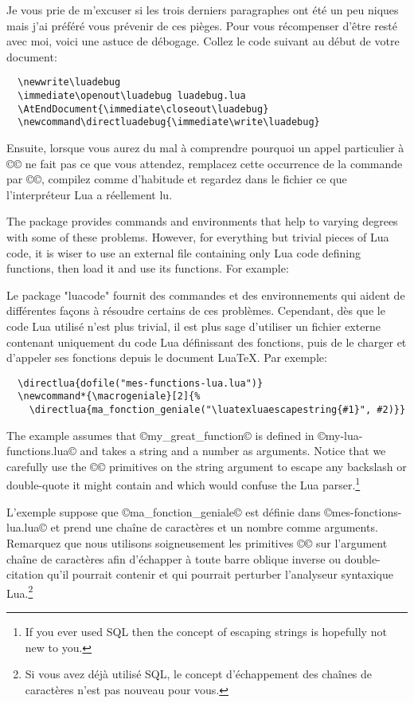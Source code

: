 \documentclass{lltxdoc}
\begin{document}
Je vous prie de m'excuser si les trois derniers paragraphes ont été un peu \tex{}niques
mais j'ai préféré vous prévenir de ces pièges. Pour vous récompenser d'être resté
avec moi, voici une astuce de débogage.
Collez le code suivant au début de votre document:
\begin{Verbatim}
  \newwrite\luadebug
  \immediate\openout\luadebug luadebug.lua
  \AtEndDocument{\immediate\closeout\luadebug}
  \newcommand\directluadebug{\immediate\write\luadebug}
\end{Verbatim}
Ensuite, lorsque vous aurez du mal à comprendre pourquoi un appel particulier
à ©\directlua© ne fait pas ce que vous attendez, remplacez cette occurrence
de la commande par ©\directluadebug©, compilez comme d'habitude et regardez
dans le fichier  ce que l'interpréteur Lua a réellement lu.


The  package provides commands and environments that help to
varying degrees with some of these problems. However, for everything but
trivial pieces of Lua code, it is wiser to use an external file containing
only Lua code defining functions, then load it and use its functions. For
example:

Le package "luacode" fournit des commandes et des environnements qui aident de différentes façons à résoudre certains de ces problèmes. Cependant, dès que le code Lua utilisé n'est plus trivial, il est plus sage d'utiliser un fichier externe contenant uniquement du code Lua définissant des fonctions, puis de le charger et d'appeler ses fonctions depuis le document LuaTeX. Par exemple:
\begin{Verbatim}
  \directlua{dofile("mes-functions-lua.lua")}
  \newcommand*{\macrogeniale}[2]{%
    \directlua{ma_fonction_geniale("\luatexluaescapestring{#1}", #2)}}
\end{Verbatim}
The example assumes that ©my_great_function© is defined in
©my-lua-functions.lua© and takes a string and a number as arguments. Notice
that we carefully use the ©\luatexluaescapestring© primitives on the string
argument to escape any backslash or double-quote it might contain and which
would confuse the Lua parser.\footnote{If you ever used SQL then the concept
  of escaping strings is hopefully not new to you.}

L'exemple suppose que ©ma_fonction_geniale© est définie dans ©mes-fonctions-lua.lua© et prend une chaîne de caractères et un nombre comme arguments. Remarquez que nous utilisons soigneusement les primitives ©\luatexluaescapestring© sur l'argument chaîne de caractères afin d'échapper à toute barre oblique inverse ou double-citation qu'il pourrait contenir et qui pourrait perturber l'analyseur syntaxique Lua.\footnote{Si vous avez déjà utilisé SQL, le concept d'échappement des chaînes de caractères n'est pas nouveau pour vous.}
\end{document}
